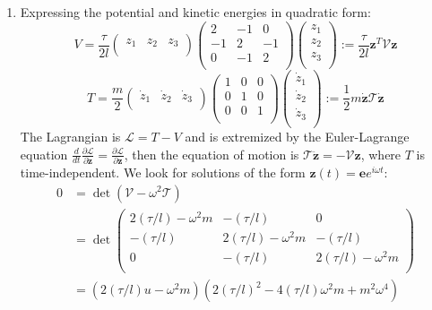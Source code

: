 \documentclass[a4paper]{article}
\begin{document}
\begin{ans}\leavevmode
\begin{enumerate}[label=(\roman*)]
\item Expressing the potential and kinetic energies in quadratic form:
$$V=\frac{\tau}{2l}\begin{pmatrix}z_1&z_2&z_3\\\end{pmatrix}\begin{pmatrix}2&-1&0\\-1&2&-1\\0&-1&2\\\end{pmatrix}\begin{pmatrix}z_1\\z_2\\z_3\\\end{pmatrix}:=\frac{\tau}{2l}\mathbf{z}^T\mathcal{V}\mathbf{z}$$
$$T=\frac{m}{2}\begin{pmatrix}\dot{z}_1&\dot{z}_2&\dot{z}_3\\\end{pmatrix}\begin{pmatrix}1&0&0\\0&1&0\\0&0&1\\\end{pmatrix}\begin{pmatrix}\dot{z}_1\\\dot{z}_2\\\dot{z}_3\\\end{pmatrix}:=\frac{1}{2}m\mathbf{\dot{z}}\mathcal{T}\mathbf{\dot{z}}$$
The Lagrangian is $\mathcal{L}=T-V$ and is extremized by the Euler-Lagrange equation $\frac{d}{dt}\frac{\partial\mathcal{L}}{\partial\mathbf{\dot{z}}}=\frac{\partial\mathcal{L}}{\partial\mathbf{z}}$, then the equation of motion is $\mathcal{T}\mathbf{\ddot{z}}=-\mathcal{V}\mathbf{z}$, where $T$ is time-independent. We look for solutions of the form $\mathbf{z}(t)=\mathbf{e}e^{i\omega t}$:
\begin{align}
0&=\det(\mathcal{V}-\omega^2\mathcal{T})\nonumber\\&=\det\begin{pmatrix}2(\tau/l)-\omega^2m&-(\tau/l)&0\\-(\tau/l)&2(\tau/l)-\omega^2m&-(\tau/l)\\0&-(\tau/l)&2(\tau/l)-\omega^2m\\\end{pmatrix}\nonumber\\&=(2(\tau/l)u-\omega^2m)(2(\tau/l)^2-4(\tau/l)\omega^2m+m^2\omega^4)\nonumber

\end{align}
\end{enumerate}
\end{ans}
\end{document}
